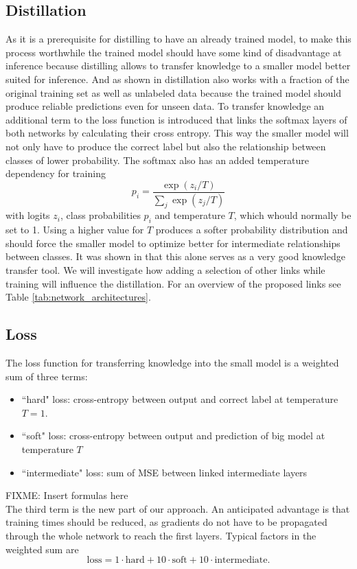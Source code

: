 \documentclass[10pt,twocolumn,letterpaper]{article}
\begin{document}
\subsection{Distillation}
As it is a prerequisite for distilling to have an already trained model, to make this process worthwhile the trained model should have some kind of disadvantage at inference because distilling allows to transfer knowledge to a smaller model better suited for inference. And as shown in \cite{hinton2015distilling} distillation also works with a fraction of the original training set as well as unlabeled data because the trained model should produce reliable predictions even for unseen data.
To transfer knowledge an additional term to the loss function is introduced that links the softmax layers of both networks by calculating their cross entropy. This way the smaller model will not only have to produce the correct label but also the relationship between classes of lower probability. The softmax also has an added temperature dependency for training
\begin{equation}
	p_i = \frac{\exp(z_i / T)}{\sum_j \exp(z_j/T)}
	\label{eq:softmaxtemperature}
\end{equation}
with logits $z_i$, class probabilities $p_i$ and temperature $T$, which whould normally be set to 1. Using a higher value for $T$ produces a softer probability distribution and should force the smaller model to optimize better for intermediate relationships between classes. It was shown in \cite{hinton2015distilling} that this alone serves as a very good knowledge transfer tool. We will investigate how adding a selection of other links while training will influence the distillation. For an overview of the proposed links see Table \ref{tab:network_architectures}.

\subsection{Loss}
The loss function for transferring knowledge into the small model is a weighted sum of three terms:
\begin{itemize}
	\item ``hard" loss: cross-entropy between output and correct label at temperature $T=1$.
	\item ``soft" loss: cross-entropy between output and prediction of big model at temperature $T$
	\item ``intermediate" loss: sum of MSE between linked intermediate layers
\end{itemize}
FIXME: Insert formulas here \\
The third term is the new part of our approach. An anticipated advantage is that training times should be reduced, as gradients do not have to be propagated through the whole network to reach the first layers. Typical factors in the weighted sum are
\begin{equation}
	\text{loss} = 1 \cdot \text{hard} + 10 \cdot \text{soft} + 10 \cdot \text{intermediate}.
	\label{eq:lossfactors}
\end{equation}
\end{document}
